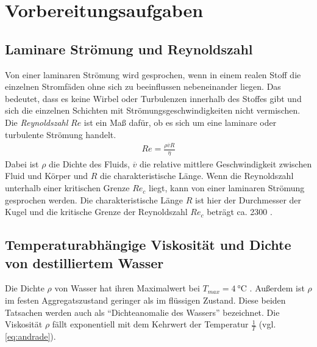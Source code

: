\section{Vorbereitungsaufgaben}
\subsection{Laminare Strömung und Reynoldszahl}
\label{sec:vorbereitung}
Von einer laminaren Strömung wird gesprochen, wenn in einem realen Stoff
die einzelnen Stromfäden ohne sich zu beeinflussen nebeneinander liegen. Das bedeutet, dass es keine Wirbel oder
Turbulenzen innerhalb des Stoffes gibt und sich die einzelnen Schichten mit Strömungsgeschwindigkeiten nicht vermischen.
Die \textit{Reynoldszahl} $Re$ ist ein Maß dafür, ob es sich um eine laminare oder turbulente Strömung handelt.
\noindent
\begin{align}
    Re = \frac{\rho \overline{v} R}{\eta}
    \label{eq:reynold}
\end{align}
Dabei ist $\rho$ die Dichte des Fluids, $\overline{v}$ die relative mittlere Geschwindigkeit zwischen Fluid und Körper und
$R$ die charakteristische Länge.
Wenn die Reynoldszahl unterhalb einer kritischen Grenze $Re_c$ liegt, kann von einer laminaren Strömung gesprochen werden.
Die charakteristische Länge $R$ ist hier der Durchmesser der Kugel und die kritische Grenze der Reynoldszahl $Re_c$ beträgt ca. 2300 \cite*[]{geschke}.


\subsection{Temperaturabhängige Viskosität und Dichte von destilliertem Wasser}
Die Dichte $\rho$ von Wasser hat ihren Maximalwert bei $T_{max} = \qty[]{4}{\degreeCelsius}$ \cite*[]{geschke}.
Außerdem ist $\rho$ im festen Aggregatszustand geringer als im flüssigen Zustand. 
Diese beiden Tatsachen werden auch als \enquote{Dichteanomalie des Wassers} bezeichnet\cite*[]{demtroeder}.
Die Viskosität $\rho$ fällt exponentiell mit dem Kehrwert der Temperatur $\frac{1}{T}$ (vgl. \eqref{eq:andrade}).

